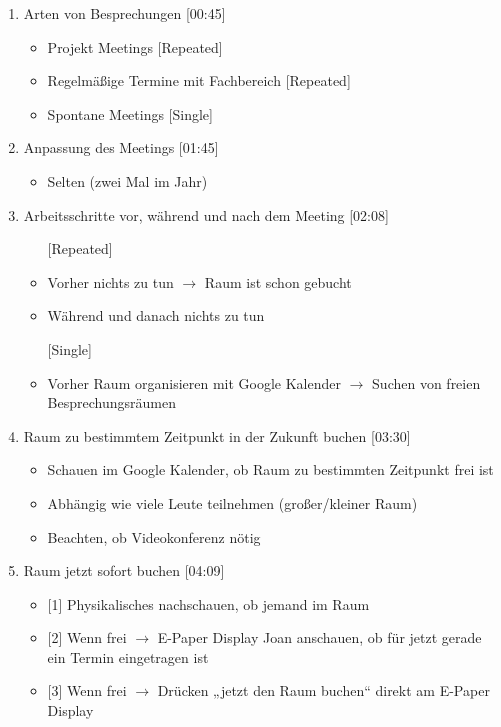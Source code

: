 \begin{enumerate}

    \item Arten von Besprechungen [00:45]
    \begin{itemize}
        \item Projekt Meetings [Repeated]
        \item Regelmäßige Termine mit Fachbereich [Repeated]
        \item Spontane Meetings [Single]
    \end{itemize}
    
    \item Anpassung des Meetings [01:45]
    \begin{itemize}
        \item Selten (zwei Mal im Jahr)
    \end{itemize}
    
    \item Arbeitsschritte vor, während und nach dem Meeting [02:08]
    \begin{itemize}
        \item[] [Repeated]
        \item Vorher nichts zu tun $\rightarrow$ Raum ist schon gebucht
        \item Während und danach nichts zu tun
        \item[] [Single]
        \item Vorher Raum organisieren mit Google Kalender $\rightarrow$ Suchen von freien Besprechungsräumen
    \end{itemize}
    
    \item Raum zu bestimmtem Zeitpunkt in der Zukunft buchen [03:30]
    \begin{itemize}
        \item Schauen im Google Kalender, ob Raum zu bestimmten Zeitpunkt frei ist
        \item Abhängig wie viele Leute teilnehmen (großer/kleiner Raum)
        \item Beachten, ob Videokonferenz nötig
    \end{itemize}
    
    \item Raum jetzt sofort buchen [04:09]
    \begin{itemize}
        \item{} [1] Physikalisches nachschauen, ob jemand im Raum 
        \item{} [2] Wenn frei $\rightarrow$ E-Paper Display Joan anschauen, ob für jetzt gerade ein Termin eingetragen ist
        \item{} [3] Wenn frei $\rightarrow$ Drücken „jetzt den Raum buchen“ direkt am E-Paper Display
    \end{itemize}
    

\end{enumerate}
